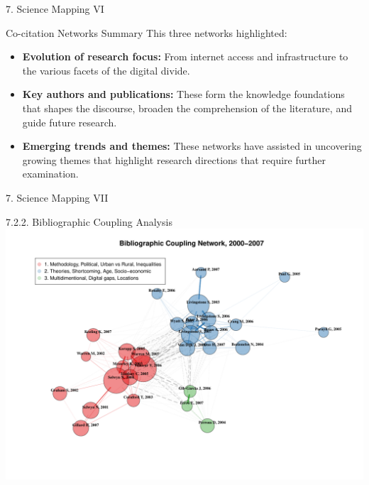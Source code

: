 \documentclass[
  ignorenonframetext,
]{beamer}
\begin{document}
\begin{frame}{7. Science Mapping VI}
\protect\hypertarget{science-mapping-vi}{}
\begin{block}{Co-citation Networks Summary}
\protect\hypertarget{co-citation-networks-summary}{}
This three networks highlighted:

\begin{itemize}
\item
  \textbf{Evolution of research focus:} From internet access and
  infrastructure to the various facets of the digital divide.
\item
  \textbf{Key authors and publications:} These form the knowledge
  foundations that shapes the discourse, broaden the comprehension of
  the literature, and guide future research.
\item
  \textbf{Emerging trends and themes:} These networks have assisted in
  uncovering growing themes that highlight research directions that
  require further examination.
\end{itemize}
\end{block}
\end{frame}

\begin{frame}{7. Science Mapping VII}
\protect\hypertarget{science-mapping-vii}{}
\begin{block}{7.2.2. Bibliographic Coupling Analysis}
\protect\hypertarget{bibliographic-coupling-analysis}{}
\includegraphics{Presentation_bibliometric_files/figure-beamer/Bib_coup_P1-1.pdf}
\end{block}
\end{frame}
\end{document}
